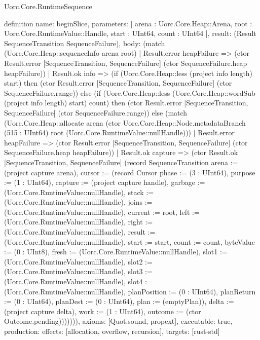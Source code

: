 \begin{lexlean}{Uorc.Core.RuntimeSequence}
\begin{semanticmodule}
definition{
  name: beginSlice,
  parameters: [
    arena : Uorc.Core.Heap::Arena,
    root : Uorc.Core.RuntimeValue::Handle,
    start : UInt64,
    count : UInt64
  ],
  result: (Result SequenceTransition SequenceFailure),
  body: (match (Uorc.Core.Heap::sequenceInfo arena root)
    | Result.error heapFailure => (ctor Result.error [SequenceTransition, SequenceFailure] (ctor SequenceFailure.heap heapFailure))
    | Result.ok info => (if (Uorc.Core.Heap::less (project info length) start) then (ctor Result.error [SequenceTransition, SequenceFailure] (ctor SequenceFailure.range)) else (if (Uorc.Core.Heap::less (Uorc.Core.Heap::wordSub (project info length) start) count) then (ctor Result.error [SequenceTransition, SequenceFailure] (ctor SequenceFailure.range)) else (match (Uorc.Core.Heap::allocate arena (ctor Uorc.Core.Heap::Node.metadataBranch (515 : UInt64) root (Uorc.Core.RuntimeValue::nullHandle)))
      | Result.error heapFailure => (ctor Result.error [SequenceTransition, SequenceFailure] (ctor SequenceFailure.heap heapFailure))
      | Result.ok capture => (ctor Result.ok [SequenceTransition, SequenceFailure] (record SequenceTransition {arena := (project capture arena), cursor := (record Cursor {phase := (3 : UInt64), purpose := (1 : UInt64), capture := (project capture handle), garbage := (Uorc.Core.RuntimeValue::nullHandle), stack := (Uorc.Core.RuntimeValue::nullHandle), joins := (Uorc.Core.RuntimeValue::nullHandle), current := root, left := (Uorc.Core.RuntimeValue::nullHandle), right := (Uorc.Core.RuntimeValue::nullHandle), result := (Uorc.Core.RuntimeValue::nullHandle), start := start, count := count, byteValue := (0 : UInt8), fresh := (Uorc.Core.RuntimeValue::nullHandle), slot1 := (Uorc.Core.RuntimeValue::nullHandle), slot2 := (Uorc.Core.RuntimeValue::nullHandle), slot3 := (Uorc.Core.RuntimeValue::nullHandle), slot4 := (Uorc.Core.RuntimeValue::nullHandle), planPosition := (0 : UInt64), planReturn := (0 : UInt64), planDest := (0 : UInt64), plan := (emptyPlan)}), delta := (project capture delta), work := (1 : UInt64), outcome := (ctor Outcome.pending)})))))),
  axioms: [Quot.sound, propext],
  executable: true,
  production: {effects: [allocation, overflow, recursion], targets: [rust-std]}
}


\end{semanticmodule}
\end{lexlean}
